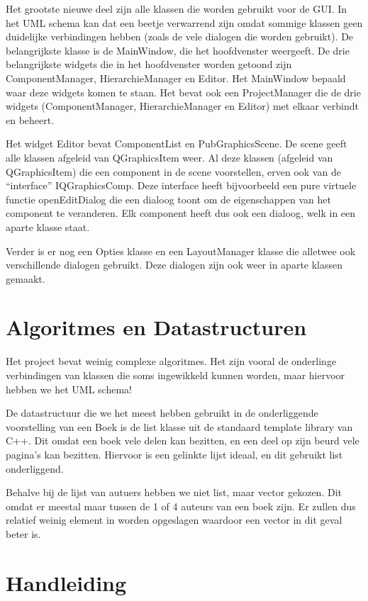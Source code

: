 \documentclass[a4paper,11pt]{article}
\begin{document}
Het grootste nieuwe deel zijn alle klassen die worden gebruikt voor de GUI. In het UML schema kan dat een beetje verwarrend
zijn omdat sommige klassen geen duidelijke verbindingen hebben (zoals de vele dialogen die worden gebruikt). De belangrijkste
klasse is de MainWindow, die het hoofdvenster weergeeft. De drie belangrijkste widgets die in het hoofdvenster worden
getoond zijn ComponentManager, HierarchieManager en Editor. Het MainWindow bepaald waar deze widgets komen te staan.
Het bevat ook een ProjectManager die de drie widgets (ComponentManager, HierarchieManager en Editor) met elkaar
verbindt en beheert.

Het widget Editor bevat ComponentList en PubGraphicsScene. De scene geeft alle klassen afgeleid van QGraphicsItem weer.
Al deze klassen (afgeleid van QGraphicsItem) die een component in de scene voorstellen, erven ook van de ``interface''
IQGraphicsComp. Deze interface heeft bijvoorbeeld een pure virtuele functie openEditDialog die een dialoog toont om de
eigenschappen van het component te veranderen. Elk component heeft dus ook een dialoog, welk in een aparte klasse staat.

Verder is er nog een Opties klasse en een LayoutManager klasse die alletwee ook verschillende dialogen gebruikt. Deze dialogen
zijn ook weer in aparte klassen gemaakt.

\section{Algoritmes en Datastructuren}

Het project bevat weinig complexe algoritmes. Het zijn vooral de onderlinge verbindingen van klassen die soms ingewikkeld
kunnen worden, maar hiervoor hebben we het UML schema!

De datastructuur die we het meest hebben gebruikt in de onderliggende voorstelling van een Boek is de list klasse uit de
standaard template library van C++. Dit omdat een boek vele delen kan bezitten, en een deel op zijn beurd vele pagina's
kan bezitten. Hiervoor is een gelinkte lijst ideaal, en dit gebruikt list onderliggend.

Behalve bij de lijst van autuers hebben we niet list, maar vector gekozen. Dit omdat er meestal maar tussen de 1 of 4
auteurs van een boek zijn. Er zullen dus relatief weinig element in worden opgeslagen waardoor een vector in
dit geval beter is.

\section{Handleiding}
\end{document}
